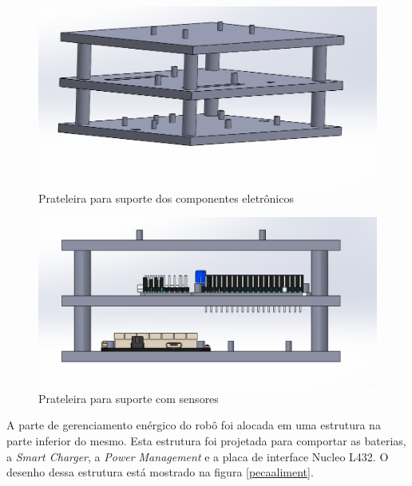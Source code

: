  \begin{figure}[h]
 	\centering
 	\includegraphics[width=14cm]{Figures/prateleira.png}
 	\caption{Prateleira para suporte dos componentes eletrônicos} \label{Prateleira}
 \end{figure}
 
  \begin{figure}[h]
  	\centering
  	\includegraphics[width=16cm]{Figures/prateleiracsensores.png}
  	\caption{Prateleira para suporte com sensores} \label{Prateleiracsensor}
  \end{figure}
 

A parte de gerenciamento enérgico do robô foi alocada em uma estrutura na parte inferior do mesmo. Esta estrutura foi projetada para comportar as baterias, a \textit{Smart Charger}, a \textit{Power Management} e a placa de interface Nucleo L432. O desenho dessa estrutura está mostrado na figura \ref{pecaaliment}.

